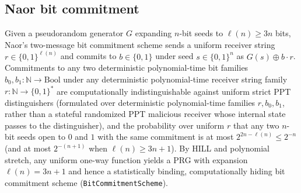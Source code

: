 \begin{result}
\subsection{Naor bit commitment}
Given a pseudorandom generator $G$ expanding $n$-bit seeds to $\ell(n)\ge 3n$ bits,
Naor's two-message bit commitment scheme sends a uniform receiver string $r\in\{0,1\}^{\ell(n)}$
and commits to $b\in\{0,1\}$ under seed $s\in\{0,1\}^n$ as $G(s)\oplus b\cdot r$.
Commitments to any two deterministic polynomial-time bit families $b_0,b_1:\mathbb N\to\mathrm{Bool}$
under any deterministic polynomial-time receiver string family $r:\mathbb N\to\{0,1\}^*$ are
computationally indistinguishable against uniform strict PPT distinguishers (formulated over
deterministic polynomial-time families $r,b_0,b_1$, rather than a stateful randomized PPT malicious
receiver whose internal state passes to the distinguisher), and the probability over uniform $r$ that
any two $n$-bit seeds open to $0$ and $1$ with the same commitment is at most
$2^{2n-\ell(n)}\le 2^{-n}$ (and at most $2^{-(n+1)}$ when $\ell(n)\ge 3n+1$). By HILL and polynomial
stretch, any uniform one-way function yields a PRG with expansion $\ell(n)=3n+1$ and hence a
statistically binding, computationally hiding bit commitment scheme (\texttt{BitCommitmentScheme}).\citep{Naor1991}
\end{result}

